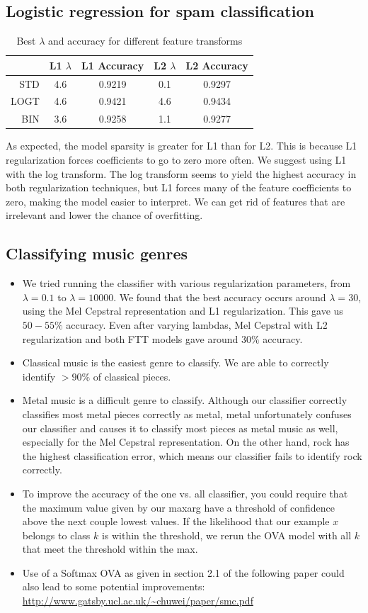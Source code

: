\documentclass[pdftex,11pt]{article}
\begin{document}
\subsection{Logistic regression for spam classification}
\begin{table}[h]
\caption{Best $\lambda$ and accuracy for different feature transforms}
\centering
\begin{tabular}{r || c c | c c}
& L1 $\lambda$ & L1 Accuracy & L2 $\lambda$ & L2 Accuracy\\
\hline
STD & 4.6 & 0.9219 & 0.1 & 0.9297\\
LOGT & 4.6 & 0.9421 & 4.6 & 0.9434\\
BIN & 3.6 & 0.9258 & 1.1 & 0.9277\\
\end{tabular}
\end{table}
As expected, the model sparsity is greater for L1 than for L2. This is because L1 regularization forces coefficients to go to zero more often. We suggest using L1 with the log transform. The log transform seems to yield the highest accuracy in both regularization techniques, but L1 forces many of the feature coefficients to zero, making the model easier to interpret. We can get rid of features that are irrelevant and lower the chance of overfitting.

\pagebreak
\subsection{Classifying music genres}
\begin{itemize}
\item We tried running the classifier with various regularization parameters, from $\lambda=0.1$ to $\lambda=10000$. We found that the best accuracy occurs around $\lambda=30$, using the Mel Cepstral representation and L1 regularization. This gave us $50-55\%$ accuracy. Even after varying lambdas, Mel Cepstral with L2 regularization and both FTT models gave around $30\%$ accuracy.
\item Classical music is the easiest genre to classify. We are able to correctly identify $>90\%$ of classical pieces.
\item Metal music is a difficult genre to classify. Although our classifier correctly classifies most metal pieces correctly as metal, metal unfortunately confuses our classifier and causes it to classify most pieces as metal music as well, especially for the Mel Cepstral representation. On the other hand, rock has the highest classification error, which means our classifier fails to identify rock correctly.
\item To improve the accuracy of the one vs. all classifier, you could require that the maximum value given by our maxarg have a threshold of confidence above the next couple lowest values. If the likelihood that our example $x$ belongs to class $k$ is within the threshold, we rerun the OVA model with all $k$ that meet the threshold within the max.  
\item Use of a Softmax OVA as given in section 2.1 of the following paper could also lead to some potential improvements: \url{http://www.gatsby.ucl.ac.uk/~chuwei/paper/smc.pdf}
\end{itemize}
\end{document}
